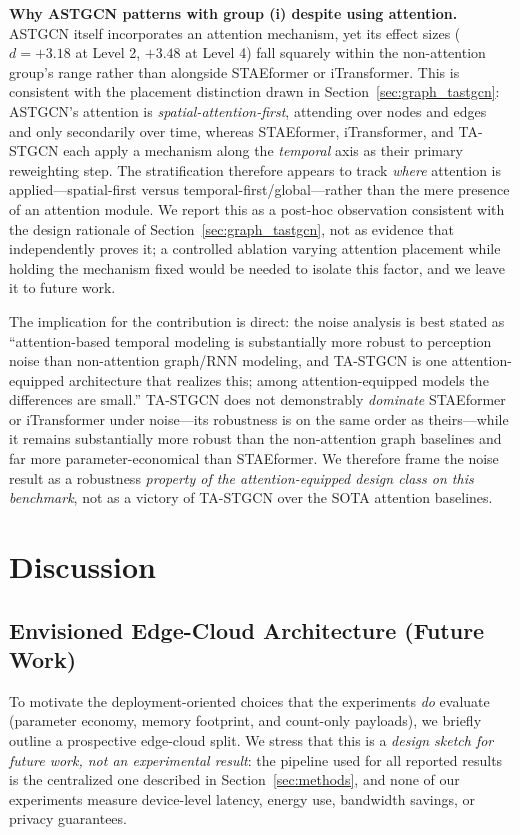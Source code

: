 \documentclass[preprint,12pt]{elsarticle}
\begin{document}
\textbf{Why ASTGCN patterns with group (i) despite using attention.} ASTGCN itself incorporates an attention mechanism, yet its effect sizes ($d = +3.18$ at Level 2, $+3.48$ at Level 4) fall squarely within the non-attention group's range rather than alongside STAEformer or iTransformer. This is consistent with the placement distinction drawn in Section~\ref{sec:graph_tastgcn}: ASTGCN's attention is \emph{spatial-attention-first}, attending over nodes and edges and only secondarily over time, whereas STAEformer, iTransformer, and TA-STGCN each apply a mechanism along the \emph{temporal} axis as their primary reweighting step. The stratification therefore appears to track \emph{where} attention is applied---spatial-first versus temporal-first/global---rather than the mere presence of an attention module. We report this as a post-hoc observation consistent with the design rationale of Section~\ref{sec:graph_tastgcn}, not as evidence that independently proves it; a controlled ablation varying attention placement while holding the mechanism fixed would be needed to isolate this factor, and we leave it to future work.

The implication for the contribution is direct: the noise analysis is best stated as ``attention-based temporal modeling is substantially more robust to perception noise than non-attention graph/RNN modeling, and TA-STGCN is one attention-equipped architecture that realizes this; among attention-equipped models the differences are small.'' TA-STGCN does not demonstrably \emph{dominate} STAEformer or iTransformer under noise---its robustness is on the same order as theirs---while it remains substantially more robust than the non-attention graph baselines and far more parameter-economical than STAEformer. We therefore frame the noise result as a robustness \emph{property of the attention-equipped design class on this benchmark}, not as a victory of TA-STGCN over the SOTA attention baselines.

\section{Discussion}
\label{sec:deployment_limitations}

\subsection{Envisioned Edge-Cloud Architecture (Future Work)}
\label{sec:deployment_arch}

To motivate the deployment-oriented choices that the experiments \emph{do} evaluate (parameter economy, memory footprint, and count-only payloads), we briefly outline a prospective edge-cloud split. We stress that this is a \emph{design sketch for future work, not an experimental result}: the pipeline used for all reported results is the centralized one described in Section~\ref{sec:methods}, and none of our experiments measure device-level latency, energy use, bandwidth savings, or privacy guarantees.
\end{document}
